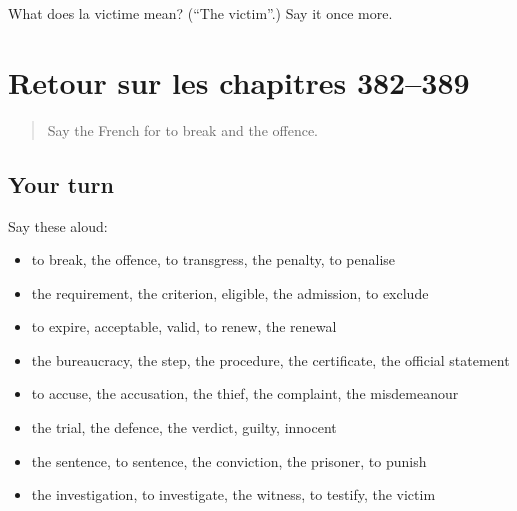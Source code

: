 \begin{tcolorbox}[breakable,colback=teal!4,colframe=teal!35!black,title={Before you move on}]
What does la victime mean? (\textquotedblleft{}The victim\textquotedblright{}.) Say it once more.
\end{tcolorbox}
\section[(dialogue)]{Retour sur les chapitres 382–389}

\label{lesson:FR-R389-revision-382-389}



\begin{quote}
Say the French for to break and the offence.
\end{quote}

\subsection*{Your turn}
Say these aloud:

\begin{itemize}
\raggedright
  \item to break, the offence, to transgress, the penalty, to penalise
  \item the requirement, the criterion, eligible, the admission, to exclude
  \item to expire, acceptable, valid, to renew, the renewal
  \item the bureaucracy, the step, the procedure, the certificate, the official statement
  \item to accuse, the accusation, the thief, the complaint, the misdemeanour
  \item the trial, the defence, the verdict, guilty, innocent
  \item the sentence, to sentence, the conviction, the prisoner, to punish
  \item the investigation, to investigate, the witness, to testify, the victim
\end{itemize}

